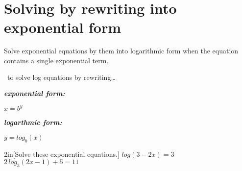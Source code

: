 \section{Solving by rewriting into exponential form}

Solve exponential equations by  them into logarithmic form 
when the equation contains a single exponential term.

\begin{myConceptSteps}{~to solve log equations by rewriting\dots}
\end{myConceptSteps}

\begin{tcbraster}[
    raster equal height,
    raster columns=2,
    raster left skip = 1in, raster right skip=1in, raster column skip=1in,
]
\begin{tcolorbox}
    \centering\large
    {\bfseries\itshape exponential form:}

    $ x = b^y$
\end{tcolorbox}
\begin{tcolorbox}
    \centering\large
    {\bfseries\itshape logarthmic form:}

    $ y = log_b(x)$
\end{tcolorbox}
\end{tcbraster}


\begin{my2Problems}[\normalsize]{2in}[Solve these exponential equations.]
    {
        $log(3-2x) = 3$
    }
    {
        $2 \, log_3(2x-1) + 5 = 11$
    }
\end{my2Problems}
